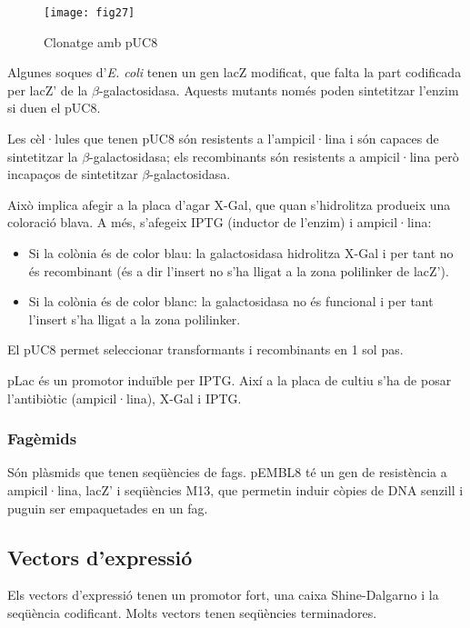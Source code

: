 \begin{figure}[H]
  \centering
  \texttt{[image: fig27]}
  \caption{Clonatge amb pUC8}
  \label{fig:fig27}
\end{figure}

Algunes soques d'\textit{E. coli} tenen un gen lacZ modificat, que
falta la part codificada per lacZ' de la
$\beta$-galactosidasa. Aquests mutants només poden sintetitzar l'enzim
si duen el pUC8.

Les cèl·lules que tenen pUC8 són resistents a l'ampicil·lina i són
capaces de sintetitzar la $\beta$-galactosidasa; els recombinants són
resistents a ampicil·lina però incapaços de sintetitzar
$\beta$-galactosidasa.

Això implica afegir a la placa d'agar X-Gal, que quan s'hidrolitza
produeix una coloració blava. A més, s'afegeix IPTG (inductor de
l'enzim) i ampicil·lina:
\begin{itemize}
\item Si la colònia és de color blau: la galactosidasa hidrolitza
  X-Gal i per tant no és recombinant (és a dir l'insert no s'ha lligat
  a la zona polilinker de lacZ').

\item Si la colònia és de color blanc: la galactosidasa no és
  funcional i per tant l'insert s'ha lligat a la zona polilinker.
\end{itemize}

El pUC8 permet seleccionar transformants i recombinants en 1 sol pas.

pLac és un promotor induïble per IPTG. Així a la placa de cultiu s'ha
de posar l'antibiòtic (ampicil·lina), X-Gal i IPTG.

\subsubsection{Fagèmids}
\label{sec:fagemids}

Són plàsmids que tenen seqüències de fags. pEMBL8 té un gen de
resistència a ampicil·lina, lacZ' i seqüències M13, que permetin
induir còpies de DNA senzill i puguin ser empaquetades en un fag.

\subsection{Vectors d'expressió}
\label{sec:vectors-dexpressio}

Els vectors d'expressió tenen un promotor fort, una caixa
Shine-Dalgarno i la seqüència codificant. Molts vectors tenen
seqüències terminadores.

